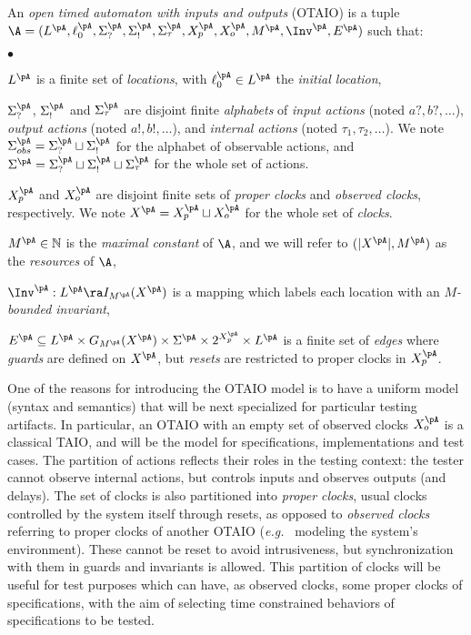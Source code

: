 \documentclass{LMCS}
\theoremstyle{plain}\newtheorem{proposition}[thm]{Proposition}
\def\eg{{\em e.g.}}
\begin{document}
\begin{defi}[OTAIO]
\label{def-ta}
An {\em open timed automaton with inputs and outputs} (OTAIO) is a tuple
$\A=(L^\pA,\ell_0^\pA,\Sigma_?^\pA,\Sigma_!^\pA,\Sigma_\tau^\pA,X_p^\pA,X_o^\pA,M^\pA,\Inv^\pA,E^\pA)$ 
such that: 
\begin{iteMize}{$\bullet$}
\item $L^\pA$ is a finite set of {\em locations}, 
with $\ell_0^\pA\in L^\pA$ the {\em initial location}, 
\item $\Sigma_?^\pA$, $\Sigma_!^\pA$ and $\Sigma_\tau^\pA$ 
are disjoint finite  {\em alphabets} of
{\em input actions} (noted $a?, b?,\ldots$), 
{\em output actions} (noted $a!, b!, \ldots$),
and {\em internal actions} (noted $\tau_1, \tau_2, \ldots$). 
We note $\Sigma_{obs}^\pA=\Sigma_?^\pA \sqcup \Sigma_!^\pA$ 
for the alphabet of observable actions,
and $\Sigma^\pA=\Sigma_?^\pA \sqcup \Sigma_!^\pA \sqcup \Sigma_\tau^\pA$ 
for the whole set of actions.
\item $X_p^\pA$ and $X_o^\pA$ are disjoint finite sets of {\em proper
    clocks} and {\em observed clocks}, respectively.  We note $X^\pA
  =X_p^\pA \sqcup X_o^\pA$ for the whole set of {\em clocks}.
\item $M^\pA\in \mathbb{N}$ is the {\em maximal constant} of $\A$, 
and we will refer to $(|X^\pA|,M^\pA)$ as the {\em resources} of $\A$,
\item $\Inv^\pA: L^\pA \ra I_{M^\pA}(X^\pA)$ is a mapping  which labels each location with an {\em $M$-bounded invariant}, 
\item $E^\pA\subseteq L^\pA\times G_{M^\pA}(X^\pA) \times \Sigma^\pA \times 2^{X_p^\pA} \times L^\pA$ is a finite set of {\em edges} where {\em guards} 
are defined on $X^\pA$,
but {\em resets} are restricted to proper clocks in $X_p^\pA$.
\end{iteMize}
\end{defi}\medskip





\noindent One of the reasons for introducing the OTAIO model is to have a
uniform model (syntax and semantics) that will be next specialized for
particular testing artifacts.  In particular, an OTAIO with an empty
set of observed clocks $X_o^\pA$ is a classical TAIO, and will be the
model for specifications, implementations and test cases.  The
partition of actions reflects their roles in the testing context: the
tester cannot observe internal actions, but controls inputs and
observes outputs (and delays).  The set of clocks is also partitioned
into {\em proper clocks}, \ie usual clocks controlled by the system
itself through resets, as opposed to {\em observed clocks} referring
to proper clocks of another OTAIO (\eg~ modeling the system's
environment).  These cannot be reset to avoid intrusiveness, but
synchronization with them in guards and invariants is allowed.
This partition of clocks will be useful for test purposes which
  can have, as observed clocks, some proper clocks of specifications,
  with the aim of selecting time constrained behaviors of
  specifications to be tested.
\end{document}
